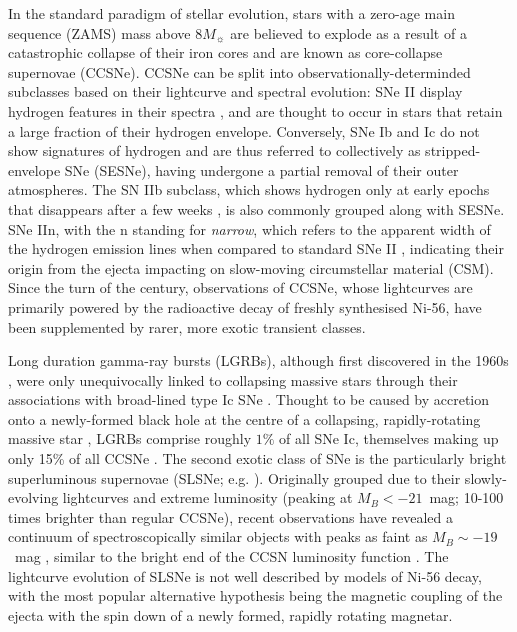 \documentclass[fleqn,usenatbib,]{mnras}
\begin{document}
In the standard paradigm of stellar evolution, stars with a zero-age main sequence (ZAMS) mass above $8M_{\sun}$ are believed to explode as a result of a catastrophic collapse of their iron cores and are known as core-collapse supernovae (CCSNe). CCSNe can be split into observationally-determinded subclasses based on their lightcurve and spectral evolution: SNe II display hydrogen features in their spectra \citep{Minkowski1941}, and are thought to occur in stars that retain a large fraction of their hydrogen envelope. Conversely, SNe Ib and Ic do not show signatures of hydrogen \citep[e.g.][]{Filippenko1997} and are thus referred to collectively as stripped-envelope SNe (SESNe), having undergone a partial removal of their outer atmospheres. The SN IIb subclass, which shows hydrogen only at early epochs that disappears after a few weeks \citep{Filippenko1988}, is also commonly grouped along with SESNe. SNe IIn, with the n standing for \textit{narrow}, which refers to the apparent width of the hydrogen emission lines when compared to standard SNe II \citep{Schlegel1990}, indicating their origin from the ejecta impacting on slow-moving circumstellar material (CSM). Since the turn of the century, observations of CCSNe, whose lightcurves are primarily powered by the radioactive decay of freshly synthesised Ni-56, have been supplemented by rarer, more exotic transient classes.

 Long duration gamma-ray bursts (LGRBs), although first discovered in the 1960s \citep{Klebesadel1973}, were only unequivocally linked to collapsing massive stars through their associations with broad-lined type Ic SNe \citep{Galama1998,Hjorth2003}. Thought to be caused by accretion onto a newly-formed black hole at the centre of a collapsing, rapidly-rotating massive star \citep[e.g.][]{Woosley1993,Woosley2006a,Woosley2006b}, LGRBs comprise roughly $1\%$ of all SNe Ic, themselves making up only 15\% of all CCSNe \citep{Kelly2012,Graham2016}. The second exotic class of SNe is the particularly bright superluminous supernovae (SLSNe; e.g. \citealt{Quimby2011, Gal-Yam2012}). Originally grouped due to their slowly-evolving lightcurves and extreme luminosity (peaking at $M_B < -21$~mag; 10-100 times brighter than regular CCSNe), recent observations have revealed a continuum of spectroscopically similar objects with peaks as faint as $M_B \sim -19$~mag \citep{DeCia2018,Lunnan2018,Angus2019}, similar to the bright end of the CCSN luminosity function \citep{Li2011}. The lightcurve evolution of SLSNe is not well described by models of Ni-56 decay, with the most popular alternative hypothesis being the magnetic coupling of the ejecta with the spin down of a newly formed, rapidly rotating magnetar.
 
\end{document}
